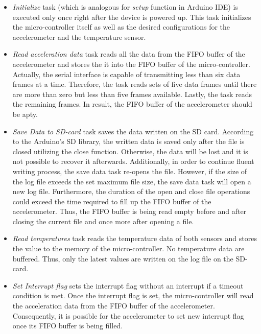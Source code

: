 \documentclass[english,12pt,a4paper,pdftex,elec,utf8]{aaltothesis}
\begin{document}
\begin{itemize}

\item \textit{Initialize} task (which is analogous for \textit{setup} function in Arduino IDE) is executed only once right after the device is powered up. This task initializes the micro-controller itself as well as the desired configurations for the accelerometer and the temperature sensor.

\item \textit{Read acceleration data} task reads all the data from the FIFO buffer of the accelerometer and stores the it into the FIFO buffer of the micro-controller. Actually, the serial interface is capable of transmitting less than six data frames at a time. Therefore, the task reads sets of five data frames until there are more than zero but less than five frames available. Lastly, the task reads the remaining frames. In result, the FIFO buffer of the accelerometer should be apty.

\item \textit{Save Data to SD-card} task saves the data written on the SD card. According to the Arduino's SD library, the written data is saved only after the file is closed utilizing the close function. Otherwise, the data will be lost and it is not possible to recover it afterwards. Additionally, in order to continue fluent writing process, the save data task re-opens the file. However, if the size of the log file exceeds the set maximum file size, the save data task will open a new log file. Furthermore, the duration of the open and close file operations could exceed the time required to fill up the FIFO buffer of the accelerometer. Thus, the FIFO buffer is being read empty before and after closing the current file and once more after opening a file. 

\item \textit{Read temperatures} task reads the temperature data of both sensors and stores the value to the memory of the micro-controller. No temperature data are buffered. Thus, only the latest values are written on the log file on the SD-card.

\item \textit{Set Interrupt flag} sets the interrupt flag without an interrupt if a timeout condition is met. Once the interrupt flag is set, the micro-controller will read the acceleration data from the FIFO buffer of the accelerometer. Consequently, it is possible for the accelerometer to set new interrupt flag once its FIFO buffer is being filled.


\end{itemize}
\end{document}
